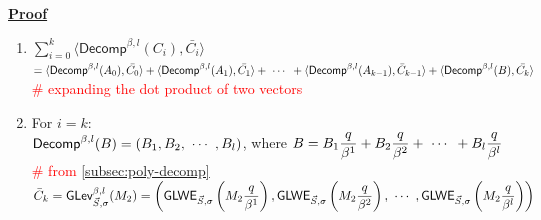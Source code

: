 \textbf{\underline{Proof}}
\begin{enumerate}
\item $\sum\limits_{i=0}^{k}\langle \textsf{Decomp}^{\beta, l}(C_i), \bar{C_i} \rangle$ \\
$= \langle \textsf{Decomp}^{\beta, l}(A_0), \bar{C_0} \rangle + \langle \textsf{Decomp}^{\beta, l}(A_1), \bar{C_1} \rangle + \text{ } \text{$\cdots$} \text{ } + \langle \textsf{Decomp}^{\beta, l}(A_{k-1}), \bar{C}_{k-1} \rangle + \langle \textsf{Decomp}^{\beta, l}(B), \bar{C_k} \rangle$ \\
\textcolor{red}{\# expanding the dot product of two vectors}
\item For $i = k$: \\
$\textsf{Decomp}^{\beta, l}(B) = (B_1, B_2, \text{ } \text{$\cdots$} \text{ }, B_l)$, where $B = B_1\dfrac{q}{\beta^1} + B_2\dfrac{q}{\beta^2} + \text{ } \text{$\cdots$} \text{ } + B_l\dfrac{q}{\beta^l}$ \textcolor{red}{\# from \autoref{subsec:poly-decomp}}\\
$\bar{C}_k = \textsf{GLev}_{\vec{S}, \sigma}^{\beta, l}(M_2) = \left(\textsf{GLWE}_{\vec{S}, \sigma}\left(M_{2}\dfrac{q}{\beta^1}\right), \textsf{GLWE}_{\vec{S}, \sigma}\left(M_{2}\dfrac{q}{\beta^2}\right), \text{ } \text{$\cdots$} \text{ }, \textsf{GLWE}_{\vec{S}, \sigma}\left(M_{2}\dfrac{q}{\beta^l}\right) \right)$ \\
$ $


\end{enumerate}
